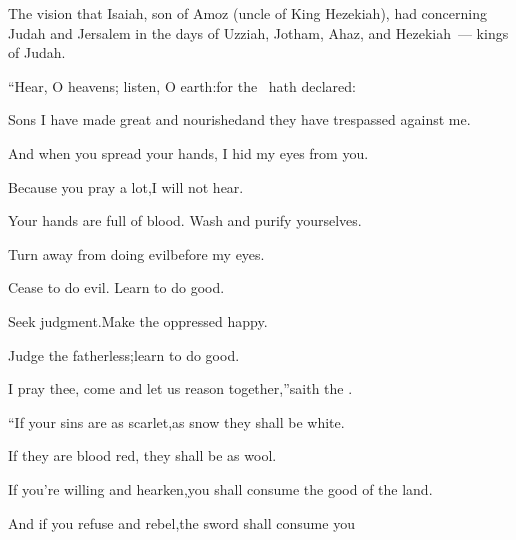 
\begin{inparaenum}
   The vision that Isaiah, son of Amoz (uncle of King Hezekiah), had concerning Judah and Jersalem in the days of Uzziah, Jotham, Ahaz, and Hezekiah~--- kings of Judah.%

  \smallskip\pa{} ``Hear, O heavens; listen, O earth:\pa{}for the \lord\ hath declared:%

  \pa{}Sons I have made great and nourished\pa{}and they have trespassed against me.%


  \pb{} And when you spread your hands,%
  \pa{}I hid my eyes from you.%

  \pc{}Because you pray a lot,\pa{}I will not hear.%

  \pc{}Your hands are full of blood.\pa{} Wash and purify yourselves.%

  \pc{}Turn away from doing evil\pa{}before my eyes.%

  \pc{}Cease to do evil.\pa{} Learn to do good.%

  \pc{}Seek judgment.\pa{}Make the oppressed happy.%

  \pc{}Judge the fatherless;\pa{}learn to do good.%

  \pb{} I pray thee, come and let us reason together,''\pa{}saith the \lord.%

  \pc{}``If your sins are as scarlet,\pa{}as snow they shall be white.%

  \pc{}If they are blood red,%
  \pa{}they shall be as wool.%

  \pb{} If you're willing and hearken,\pa{}you shall consume the good of the land.%

  \pb{} And if you refuse and rebel,\pa{}the sword shall consume you%


\end{inparaenum}
